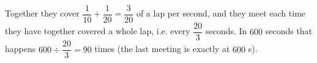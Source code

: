 Together they cover $\dfrac{1}{10}+\dfrac{1}{20}=\dfrac{3}{20}$ of a lap per second, and they meet each time they have together covered a whole lap, i.e. every $\dfrac{20}{3}$ seconds. In $600$ seconds that happens $600\div\dfrac{20}{3}=\boxed{90}$ times (the last meeting is exactly at $600$ s).
